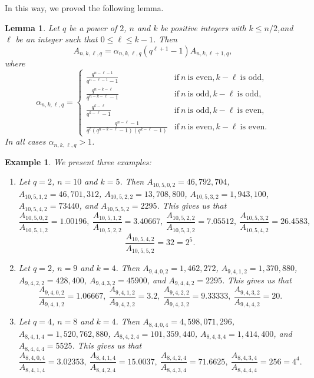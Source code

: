 \documentclass[a4paper,11pt]{article}
\newtheorem{lemma}[theorem]{Lemma}
\newtheorem{example}{Example}
\begin{document}
In this way, we proved the following lemma.

\begin{lemma}\label{lem-evenq} Let $q$ be a power of $2$, $n$ and $k$ be positive integers with $k\le n/2$,and $\ell$ be an integer such that $0\le\ell\le k-1$. Then
$$A_{n,k,\ell,q}=\alpha_{n,k,\ell,q}(q^{\ell+1}-1)A_{n,k,\ell+1,q},$$
where
\[
\alpha_{n,k,\ell,q}=\left\{\begin{array}{ll}
\frac{q^{n-\ell-1}}{q^{n-\ell-1}-1}&\mbox{if} \ n \ \mbox{is even}, k-\ell \ \mbox{is odd},\\
\frac{q^{n-k-\ell}}{q^{n-k-\ell}-1}&\mbox{if} \ n \ \mbox{is odd}, k-\ell \ \mbox{is odd},\\
\frac{q^{k-\ell}}{q^{k-\ell}-1}&\mbox{if} \ n \ \mbox{is odd}, k-\ell \ \mbox{is even},\\
\frac{q^{n-\ell}-1}{q^{\ell}(q^{n-k-\ell}-1)(q^{k-\ell}-1)}&\mbox{if} \ n \ \mbox{is even}, k-\ell \ \mbox{is even}.
\end{array}\right.
\]
In all cases $\alpha_{n,k,\ell,q}>1$.
\end{lemma}

\begin{example}\label{ex-evenq} We present three examples:
\begin{enumerate}
\item Let $q=2$, $n=10$ and $k=5$. Then $A_{10,5,0,2}=46,792,704$,
$A_{10,5,1,2}=46,701,312$, $A_{10,5,2,2}= 13,708,800$, $A_{10,5,3,2}=1,943,100$, $A_{10,5,4,2}=73440$, and $A_{10,5,5,2}=2295$. This gives us that
$$\frac{A_{10,5,0,2}}{A_{10,5,1,2}}=1.00196, \ \frac{A_{10,5,1,2}}{A_{10,5,2,2}}=3.40667, \  \frac{A_{10,5,2,2}}{A_{10,5,3,2}}=7.05512, \ \frac{A_{10,5,3,2}}{A_{10,5,4,2}}=26.4583,$$
$$\frac{A_{10,5,4,2}}{A_{10,5,5,2}}=32=2^5.$$

\item Let $q=2$, $n=9$ and $k=4$. Then $A_{9,4,0,2}=1,462,272$,
$A_{9,4,1,2}=1,370,880$, $A_{9,4,2,2}=428,400$, $A_{9,4,3,2}=45900$, and $A_{9,4,4,2}=2295$. This gives us that
$$\frac{A_{9,4,0,2}}{A_{9,4,1,2}}=1.06667, \ \frac{A_{9,4,1,2}}{A_{9,4,2,2}}=3.2, \  \frac{A_{9,4,2,2}}{A_{9,4,3,2}}=9.33333, \ \frac{A_{9,4,3,2}}{A_{9,4,4,2}}=20.$$

\item Let $q=4$, $n=8$ and $k=4$. Then $A_{8,4,0,4}=4,598,071,296$,
$A_{8,4,1,4}=1,520,762,880$, $A_{8,4,2,4}=101,359,440$, $A_{8,4,3,4}=1,414,400$, and $A_{8,4,4,4}=5525$. This gives us that
$$\frac{A_{8,4,0,4}}{A_{8,4,1,4}}=3.02353, \ \frac{A_{8,4,1,4}}{A_{8,4,2,4}}=15.0037, \  \frac{A_{8,4,2,4}}{A_{8,4,3,4}}=71.6625, \ \frac{A_{8,4,3,4}}{A_{8,4,4,4}}=256=4^4.$$

\end{enumerate}
\end{example}
\end{document}
